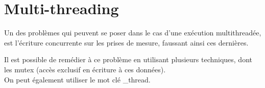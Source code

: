 \section{Multi-threading}

Un des problèmes qui peuvent se poser dans le cas d'une exécution multithreadée, est l'écriture concurrente sur les prises de mesure, faussant ainsi ces dernières. 

Il est possible de remédier à ce problème en utilisant plusieurs techniques, dont les mutex (accès exclusif en écriture à ces données).\\
On peut également utiliser le mot clé \_thread.

